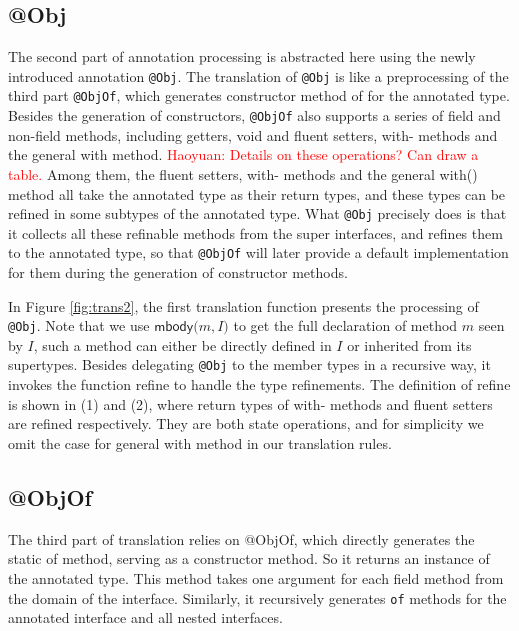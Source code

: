 \subsection{\textsf{@Obj}}
The second part of annotation processing is abstracted here using the newly introduced annotation
\lstinline{@Obj}. The translation of \lstinline{@Obj} is like a preprocessing of the third part \lstinline{@ObjOf},
which generates constructor method \textsf{of} for the annotated type. Besides the generation of constructors, \lstinline{@ObjOf} also supports
a series of field and non-field methods, including getters, void and fluent setters, \textsf{with}- methods and the general \textsf{with} method.
\textcolor{red}{Haoyuan: Details on these operations? Can draw a table.} Among them, the fluent setters, \textsf{with}- methods and the general \textsf{with()} method all take the annotated type as their return types, and these types can be refined in some subtypes of the annotated type. What \lstinline{@Obj} precisely does is that it collects all these refinable methods from the super interfaces, and refines them to the annotated type, so that \lstinline{@ObjOf} will later provide a default implementation for them during the generation of constructor methods.

In Figure \ref{fig:trans2}, the first translation function presents the processing of \lstinline{@Obj}. Note that we use $\textsf{mbody(}m,I\textsf{)}$ to get the full declaration of method $m$ seen by $I$, such a method can either be directly defined in $I$ or inherited from its supertypes. Besides delegating \lstinline{@Obj} to the member types in a recursive way, it invokes the function \textsf{refine} to handle the type refinements. The definition of \textsf{refine} is shown in (1) and (2), where return types of \textsf{with-} methods and fluent setters are refined respectively. They are both state operations, and for simplicity we omit the case for general \textsf{with} method in our translation rules.

\subsection{\textsf{@ObjOf}}
The third part of translation relies on \textsf{@ObjOf}, which directly generates the static \textsf{of} method, serving as a constructor method. So it returns an instance of the annotated type. This method takes one argument for each field method from the domain of the interface. Similarly, it recursively generates \lstinline{of} methods for the annotated interface and all nested interfaces.

